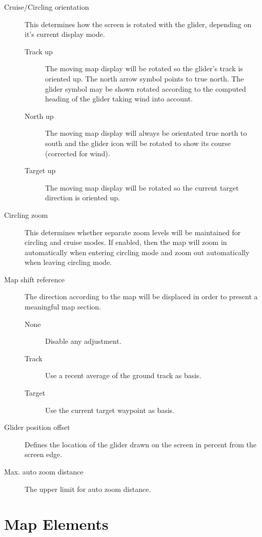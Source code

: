 \begin{description}
\item[Cruise/Circling orientation]  \label{conf:orientation} This determines how
the screen is rotated with the glider, depending on it's current display mode.
\begin{description}
\item[Track up]  The moving map display will be rotated so the glider's track
 is oriented up. The north arrow symbol points to true north. The glider symbol 
 may be shown rotated according to the computed heading of the glider taking wind into account.
\item[North up]  The moving map display will always be orientated true north to
 south and the glider icon will be rotated to show its course (corrected for
 wind).
\item[Target up]  The moving map display will be rotated so the current target
 direction is oriented up.
\end{description}

\item[Circling zoom]  \label{conf:circlingzoom} This determines whether separate
zoom levels will be maintained for circling and cruise modes.  If enabled, then the 
map will zoom in automatically when entering circling mode and zoom out
automatically when leaving circling mode.

\item[Map shift reference]  The direction according to the map will be displaced 
 in order to present a meaningful map section.
\begin{description}
  \item[None]  Disable any adjustment.
  \item[Track]  Use a recent average of the ground track as basis.
  \item[Target]  Use the current target waypoint as basis.
\end{description}

\item[Glider position offset]  \label{conf:gliderposition} Defines the location of the 
 glider drawn on the screen in percent from the screen edge.

\item[Max. auto zoom distance]  The upper limit for auto zoom distance.
\end{description}


\clearpage
\section{Map Elements}\label{sec:map-elements}

